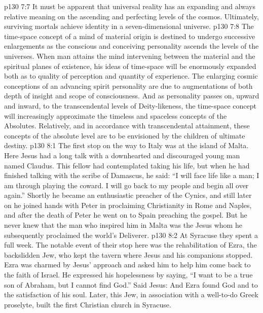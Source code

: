 \vs p130 7:7 It must be apparent that universal reality has an expanding and always relative meaning on the ascending and perfecting levels of the cosmos. Ultimately, surviving mortals achieve identity in a seven\hyp{}dimensional universe.
\vs p130 7:8 \pc The time\hyp{}space concept of a mind of material origin is destined to undergo successive enlargements as the conscious and conceiving personality ascends the levels of the universes. When man attains the mind intervening between the material and the spiritual planes of existence, his ideas of time\hyp{}space will be enormously expanded both as to quality of perception and quantity of experience. The enlarging cosmic conceptions of an advancing spirit personality are due to augmentations of both depth of insight and scope of consciousness. And as personality passes on, upward and inward, to the transcendental levels of Deity\hyp{}likeness, the time\hyp{}space concept will increasingly approximate the timeless and spaceless concepts of the Absolutes. Relatively, and in accordance with transcendental attainment, these concepts of the absolute level are to be envisioned by the children of ultimate destiny.
\vs p130 8:1 The first stop on the way to Italy was at the island of Malta. Here Jesus had a long talk with a downhearted and discouraged young man named Claudus. This fellow had contemplated taking his life, but when he had finished talking with the scribe of Damascus, he said: “I will face life like a man; I am through playing the coward. I will go back to my people and begin all over again.” Shortly he became an enthusiastic preacher of the Cynics, and still later on he joined hands with Peter in proclaiming Christianity in Rome and Naples, and after the death of Peter he went on to Spain preaching the gospel. But he never knew that the man who inspired him in Malta was the Jesus whom he subsequently proclaimed the world’s Deliverer.
\vs p130 8:2 \pc At Syracuse they spent a full week. The notable event of their stop here was the rehabilitation of Ezra, the backslidden Jew, who kept the tavern where Jesus and his companions stopped. Ezra was charmed by Jesus’ approach and asked him to help him come back to the faith of Israel. He expressed his hopelessness by saying, “I want to be a true son of Abraham, but I cannot find God.” Said Jesus:  And Ezra found God and to the satisfaction of his soul. Later, this Jew, in association with a well\hyp{}to\hyp{}do Greek proselyte, built the first Christian church in Syracuse.
